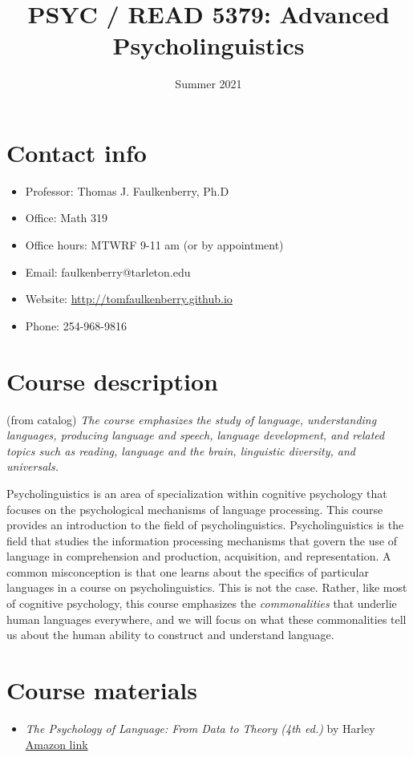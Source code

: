 \documentclass[10pt]{article}
\date{Summer 2021}
\title{PSYC / READ 5379: Advanced Psycholinguistics}
\begin{document}
\maketitle

\section*{Contact info}
\label{sec:orgda1a90e}
\begin{itemize}
\item Professor: Thomas J. Faulkenberry, Ph.D
\item Office: Math 319
\item Office hours: MTWRF 9-11 am (or by appointment)
\item Email: faulkenberry@tarleton.edu
\item Website: \url{http://tomfaulkenberry.github.io}
\item Phone: 254-968-9816
\end{itemize}

\section*{Course description}
\label{sec:org6e36480}

(from catalog) \emph{The course emphasizes the study of language, understanding languages, producing language and speech, language development, and related topics such as reading, language and the brain, linguistic diversity, and universals.}

Psycholinguistics is an area of specialization within cognitive psychology that focuses on the psychological mechanisms of language processing.  This course provides an introduction to the field of psycholinguistics. Psycholinguistics is the field that studies the information processing mechanisms that govern the use of language in comprehension and production, acquisition, and representation.  A common misconception is that one learns about the specifics of particular languages in a course on psycholinguistics.  This is not the case.  Rather, like most of cognitive psychology, this course emphasizes the \emph{commonalities} that underlie human languages everywhere, and we will focus on what these commonalities tell us about the human ability to construct and understand language. 

\section*{Course materials}
\label{sec:org15d5016}
\begin{itemize}
\item \emph{The Psychology of Language: From Data to Theory (4th ed.)} by Harley \href{https://www.amazon.com/Psychology-Language-Data-Theory/dp/1848720890}{Amazon link}
\end{itemize}
\end{document}
